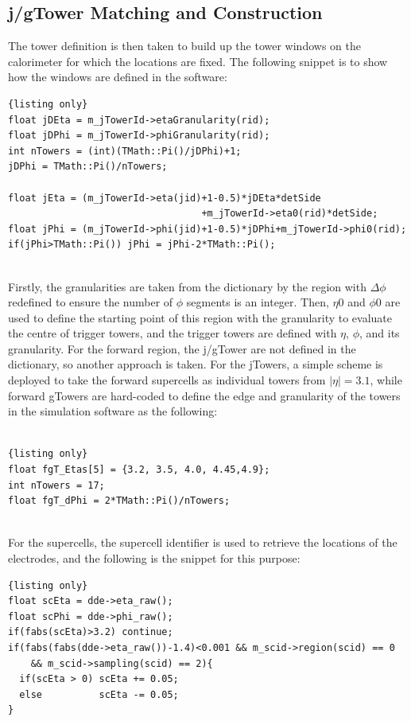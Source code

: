 \subsection{j/gTower Matching and Construction}
The tower definition is then taken to build up the tower windows on the calorimeter for which the locations are fixed. The following snippet is to show how the windows are defined in the software:
\\
\begin{lstlisting}{listing only}
float jDEta = m_jTowerId->etaGranularity(rid);
float jDPhi = m_jTowerId->phiGranularity(rid);
int nTowers = (int)(TMath::Pi()/jDPhi)+1;
jDPhi = TMath::Pi()/nTowers;

float jEta = (m_jTowerId->eta(jid)+1-0.5)*jDEta*detSide
                                  +m_jTowerId->eta0(rid)*detSide;
float jPhi = (m_jTowerId->phi(jid)+1-0.5)*jDPhi+m_jTowerId->phi0(rid);
if(jPhi>TMath::Pi()) jPhi = jPhi-2*TMath::Pi(); 
\end{lstlisting}
\noindent
\\Firstly, the granularities are taken from the dictionary by the region with $\Delta\phi$ redefined to ensure the number of $\phi$ segments is an integer. Then, $\eta0$ and $\phi0$ are used to define the starting point of this region with the granularity to evaluate the centre of trigger towers, and the trigger towers are defined with $\eta$, $\phi$, and its granularity. For the forward region, the j/gTower are not defined in the dictionary, so another approach is taken. For the jTowers, a simple scheme is deployed to take the forward supercells as individual towers from $|\eta|=3.1$, while forward gTowers are hard-coded to define the edge and granularity of the towers in the simulation software as the following:
\\
\\
\begin{lstlisting}{listing only}
float fgT_Etas[5] = {3.2, 3.5, 4.0, 4.45,4.9};
int nTowers = 17;
float fgT_dPhi = 2*TMath::Pi()/nTowers;
\end{lstlisting}
\noindent
\\For the supercells, the supercell identifier is used to retrieve the locations of the electrodes, and the following is the snippet for this purpose:
\\
\begin{lstlisting}{listing only}
float scEta = dde->eta_raw();
float scPhi = dde->phi_raw();
if(fabs(scEta)>3.2) continue;
if(fabs(fabs(dde->eta_raw())-1.4)<0.001 && m_scid->region(scid) == 0 
    && m_scid->sampling(scid) == 2){
  if(scEta > 0) scEta += 0.05;
  else          scEta -= 0.05;
}

\end{lstlisting}

